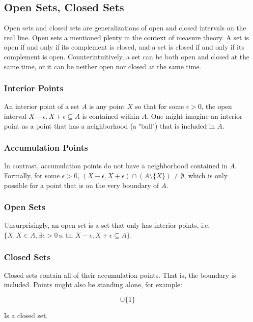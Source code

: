 \subsection{Open Sets, Closed Sets}
Open sets and closed sets are generalizations of open and closed intervals on the real line. Open sets a mentioned plenty in the context of measure theory. A set is open if and only if its complement is closed, and a set is closed if and only if its complement is open. Counterintuitively, a set can be both open and closed at the same time, or it can be neither open nor closed at the same time.

\subsubsection{Interior Points}
An interior point of a set $A$ is any point $X$ so that for some $\epsilon > 0$, the open interval $X-\epsilon,X+\epsilon \subseteq A$ is contained within $A$. One might imagine an interior point as a point that has a neighborhood (a "ball") that is included in $A$. 

\subsubsection{Accumulation Points} 
In contrast, accumulation points do not have a neighborhood contained in $A$. Formally, for some $\epsilon>0$, $(X-\epsilon,X+\epsilon)\cap (A\setminus \{X\}) \neq \emptyset$, which is only possible for a point that is on the very boundary of $A$.

\subsubsection{Open Sets}
Unsurprisingly, an open set is a set that only has interior points, i.e. $\{X: X\in A, \exists \epsilon > 0 \mathrm{\ s.\ th.\ } X-\epsilon,X+\epsilon \subseteq A  \}$.

\subsubsection{Closed Sets}
Closed sets contain all of their accumulation points. That is, the boundary is included. Points might also be standing alone, for example:

\begin{equation}
[2,4]\cup\{1\}
\end{equation}

Is a closed set.

